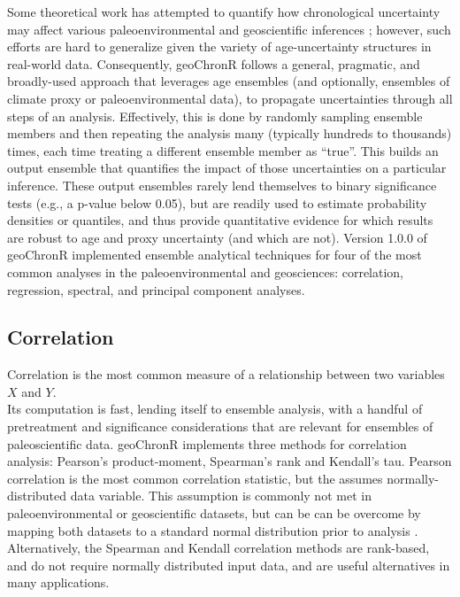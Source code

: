\documentclass[gchron, manuscript]{copernicus}
\begin{document}
Some theoretical work has attempted to quantify how chronological
uncertainty may affect various paleoenvironmental and geoscientific
inferences \citep[e.g.][]{HuybersWunsch2004}; however, such efforts are
hard to generalize given the variety of age-uncertainty structures in
real-world data. Consequently, geoChronR follows a general, pragmatic,
and broadly-used approach that leverages age ensembles (and optionally,
ensembles of climate proxy or paleoenvironmental data), to propagate
uncertainties through all steps of an analysis. Effectively, this is
done by randomly sampling ensemble members and then repeating the
analysis many (typically hundreds to thousands) times, each time
treating a different ensemble member as ``true''. This builds an output
ensemble that quantifies the impact of those uncertainties on a
particular inference. These output ensembles rarely lend themselves to
binary significance tests (e.g., a p-value below 0.05), but are readily
used to estimate probability densities or quantiles, and thus provide
quantitative evidence for which results are robust to age and proxy
uncertainty (and which are not). Version 1.0.0 of geoChronR implemented
ensemble analytical techniques for four of the most common analyses in
the paleoenvironmental and geosciences: correlation, regression,
spectral, and principal component analyses.

\hypertarget{sec:correlation}{%
\subsection{Correlation}\label{sec:correlation}}

Correlation is the most common measure of a relationship between two
variables \(X\) and \(Y\).\\
Its computation is fast, lending itself to ensemble analysis, with a
handful of pretreatment and significance considerations that are
relevant for ensembles of paleoscientific data. geoChronR implements
three methods for correlation analysis: Pearson's product-moment,
Spearman's rank and Kendall's tau. Pearson correlation is the most
common correlation statistic, but the assumes normally-distributed data
variable. This assumption is commonly not met in paleoenvironmental or
geoscientific datasets, but can be can be overcome by mapping both
datasets to a standard normal distribution prior to analysis
\citep[\citet{JEG_Tingley_CP2016}]{vanAlbada2007}. Alternatively, the
Spearman and Kendall correlation methods are rank-based, and do not
require normally distributed input data, and are useful alternatives in
many applications.
\end{document}
